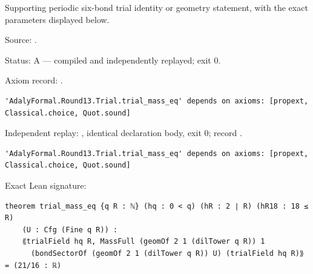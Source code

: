 \begin{theorem}[bp-373]
\label{bp-373}
\leanok
Supporting periodic six-bond trial identity or geometry statement, with the exact parameters displayed below.

\par Source: \texttt{}.
\par Status: A — compiled and independently replayed; exit 0.
\par Axiom record: \texttt{}.
\begin{verbatim}
'AdalyFormal.Round13.Trial.trial_mass_eq' depends on axioms: [propext, Classical.choice, Quot.sound]
\end{verbatim}
\par Independent replay: \texttt{}, identical declaration body, exit 0; record \texttt{}.
\begin{verbatim}
'AdalyFormal.Round13.Trial.trial_mass_eq' depends on axioms: [propext, Classical.choice, Quot.sound]
\end{verbatim}
\par Exact Lean signature:
\begin{verbatim}
theorem trial_mass_eq {q R : ℕ} (hq : 0 < q) (hR : 2 ∣ R) (hR18 : 18 ≤ R)
    (U : Cfg (Fine q R)) :
    ⟪trialField hq R, MassFull (geomOf 2 1 (dilTower q R)) 1
      (bondSectorOf (geomOf 2 1 (dilTower q R)) U) (trialField hq R)⟫ = (21/16 : ℝ)
\end{verbatim}
\end{theorem}

